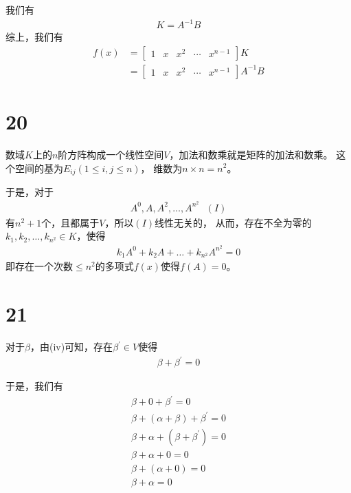 \documentclass{article}
\begin{document}
我们有
\begin{align*}
  K = A^{-1} B
\end{align*}
综上，我们有
\begin{align*}
  f(x) & = \begin{bmatrix}
             1 & x & x^2 & \cdots & x^{n-1}
           \end{bmatrix} K \\
       & = \begin{bmatrix}
        1 & x & x^2 & \cdots & x^{n-1}
      \end{bmatrix} A^{-1} B
\end{align*}

\section*{20}

数域$K$上的$n$阶方阵构成一个线性空间$V$，加法和数乘就是矩阵的加法和数乘。
这个空间的基为$E_{ij} (1 \leq i,j \leq n)$，
维数为$n \times n = n^2$。

于是，对于
\begin{align*}
  A^{0}, A, A^{2}, \dots, A^{n^2} \ \ \ (I)
\end{align*}
有$n^2 + 1$个，且都属于$V$，所以$(I)$线性无关的，
从而，存在不全为零的$k_1, k_2, \dots, k_{n^2} \in K$，使得
\begin{align*}
  k_1 A^{0} + k_2 A + \dots + k_{n^2} A^{n^2} = 0
\end{align*}
即存在一个次数$\leq n^2$的多项式$f(x)$使得$f(A) = 0$。

\section*{21}

对于$\beta$，由(iv)可知，存在$\beta^\prime \in V$使得
\begin{align*}
  \beta + \beta^\prime = 0
\end{align*}

于是，我们有
\begin{align*}
  \beta + 0 + \beta^\prime = 0                \\
  \beta + (\alpha + \beta) + \beta^\prime = 0 \\
  \beta + \alpha + (\beta + \beta^\prime) = 0 \\
  \beta + \alpha + 0 = 0                      \\
  \beta + (\alpha + 0) = 0                    \\
  \beta + \alpha  = 0
\end{align*}
\end{document}
